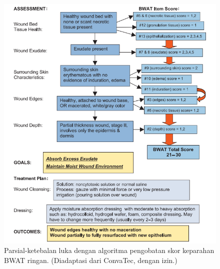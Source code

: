 \begin{figure}[H]
	\centering
	\includegraphics[keepaspectratio, width=14cm]{gambar/gambar_24}
	\caption{Parsial-ketebalan luka dengan algoritma pengobatan skor keparahan BWAT ringan. (Diadaptasi dari ConvaTec, dengan izin.) \citep{sussman2012}}
	\label{gambar:gambar_24}
\end{figure}

